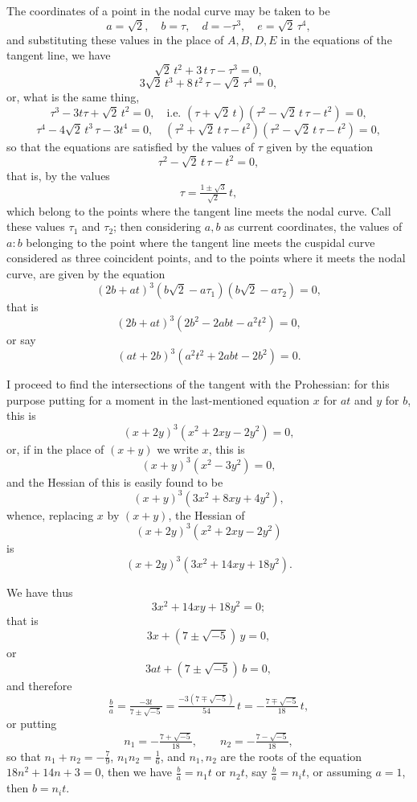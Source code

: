 \documentclass[11pt]{article}
\begin{document}
The coordinates of a point in the nodal curve may be taken to be
\[ a = \sqrt{2},\quad b = \tau,\quad d = -\tau^3,\quad e = \sqrt{2}\,\tau^4, \]
and substituting these values in the place of $A,B,D,E$ in the equations of the tangent line, we have
\[ \sqrt{2}\,t^2 + 3\,t\,\tau - \tau^3 = 0, \]
\[ 3\sqrt{2}\,t^3 + 8\,t^2\,\tau - \sqrt{2}\,\tau^4 = 0, \]
or, what is the same thing,
\[ \tau^3 - 3t\tau + \sqrt{2}\,t^2 = 0,\quad \text{i.e. } (\tau + \sqrt{2}\,t)(\tau^2 - \sqrt{2}\,t\,\tau - t^2) = 0, \]
\[ \tau^4 - 4\sqrt{2}\,t^3\,\tau - 3t^4 = 0,\quad (\tau^2 + \sqrt{2}\,t\,\tau - t^2)(\tau^2 - \sqrt{2}\,t\,\tau - t^2) = 0, \]
so that the equations are satisfied by the values of $\tau$ given by the equation
\[ \tau^2 - \sqrt{2}\,t\,\tau - t^2 = 0, \]
that is, by the values
\[ \tau = \tfrac{1 \pm \sqrt{3}}{\sqrt{2}}\,t, \]
which belong to the points where the tangent line meets the nodal curve. Call these values $\tau_1$ and $\tau_2$; then considering $a, b$ as current coordinates, the values of $a : b$ belonging to the point where the tangent line meets the cuspidal curve considered as three coincident points, and to the points where it meets the nodal curve, are given by the equation
\[ (2b + at)^3 (b\sqrt{2} - a\tau_1)(b\sqrt{2} - a\tau_2) = 0, \]
that is
\[ (2b + at)^3 (2b^2 - 2abt - a^2 t^2) = 0, \]
or say
\[ (at + 2b)^3 (a^2 t^2 + 2abt - 2b^2) = 0. \]

I proceed to find the intersections of the tangent with the Prohessian: for this purpose putting for a moment in the last-mentioned equation $x$ for $at$ and $y$ for $b$, this is
\[ (x + 2y)^3 (x^2 + 2xy - 2y^2) = 0, \]
or, if in the place of $(x + y)$ we write $x$, this is
\[ (x + y)^3 (x^2 - 3y^2) = 0, \]
and the Hessian of this is easily found to be
\[ (x + y)^3 (3x^2 + 8xy + 4y^2), \]
whence, replacing $x$ by $(x + y)$, the Hessian of
\[ (x + 2y)^3 (x^2 + 2xy - 2y^2) \]
is
\[ (x + 2y)^3 (3x^2 + 14xy + 18y^2). \]

We have thus
\[ 3x^2 + 14xy + 18y^2 = 0; \]
that is
\[ 3x + (7 \pm \sqrt{-5})\,y = 0, \]
or
\[ 3at + (7 \pm \sqrt{-5})\,b = 0, \]
and therefore
\[ \tfrac{b}{a} = \tfrac{-3t}{7 \pm \sqrt{-5}} = \tfrac{-3(7 \mp \sqrt{-5})}{54}\,t = -\tfrac{7 \mp \sqrt{-5}}{18}\,t, \]
or putting
\[ n_1 = -\tfrac{7 + \sqrt{-5}}{18},\qquad n_2 = -\tfrac{7 - \sqrt{-5}}{18}, \]
so that $n_1 + n_2 = -\tfrac{7}{9}$, $n_1 n_2 = \tfrac{1}{6}$, and $n_1, n_2$ are the roots of the equation $18n^2 + 14n + 3 = 0$, then we have $\tfrac{b}{a} = n_1 t$ or $n_2 t$, say $\tfrac{b}{a} = n_i t$, or assuming $a = 1$, then $b = n_i t$.
\end{document}
